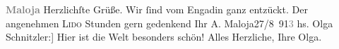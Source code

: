 \begin{ledgroupsized}[t]{13cm}
           \noindent{}\centering{}{\pb}\textcolor{gray}{\textbf{Maloja}}\pend
           \pstart
           {\pb}Herzlichſte Grüße. Wir ſind vom Engadin ganz entzückt. Der angenehmen \textsc{Lido} Stunden gern gedenkend\pend
           \pstart Ihr \spacefill\mbox{A.}\pend{}\pstart
           Maloja27/8 91\textcolor{gray}{3}\pend
           \pstart
           \noindent{}{[}hs. Olga Schnitzler:{]} Hier ist die Welt besonders schön! Alles Herzliche,\pend
           \pstart Ihre \spacefill\mbox{Olga.}\pend{}
         
         \endnumbering{}\end{ledgroupsized}  \newcommand{\dateiname}{L02150}\newcommand{\titel}{Arthur und Olga Schnitzler an Richard und Paula Beer-Hofmann, 27. 8. 1913}\newcommand{\editorInnen}{Martin Anton Müller und Gerd-Hermann Susen}
      